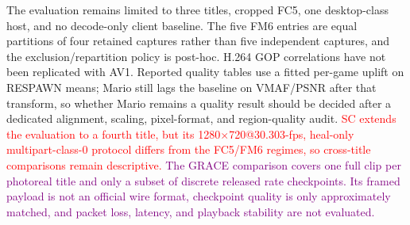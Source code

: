 The evaluation remains limited to three titles, cropped FC5, one
desktop-class host, and no decode-only client baseline. The five FM6 entries
are equal partitions of four retained captures rather than five independent
captures, and the exclusion/repartition policy is post-hoc. H.264 GOP
correlations have not been replicated with AV1. Reported quality tables use a
fitted per-game uplift on RESPAWN means; Mario still lags the baseline on
VMAF/PSNR after that transform, so whether Mario remains a quality result
should be decided after a dedicated alignment, scaling, pixel-format, and
region-quality audit.
\textcolor{red}{SC extends the evaluation to a fourth title, but its
1280$\times$720@30.303-fps, heal-only multipart-class-0 protocol differs
from the FC5/FM6 regimes, so cross-title comparisons remain descriptive.}
\textcolor{purple}{The GRACE comparison covers one full clip per photoreal
title and only a subset of discrete released rate checkpoints. Its framed
payload is not an official wire format, checkpoint quality is only
approximately matched, and packet loss, latency, and playback stability are
not evaluated.}
